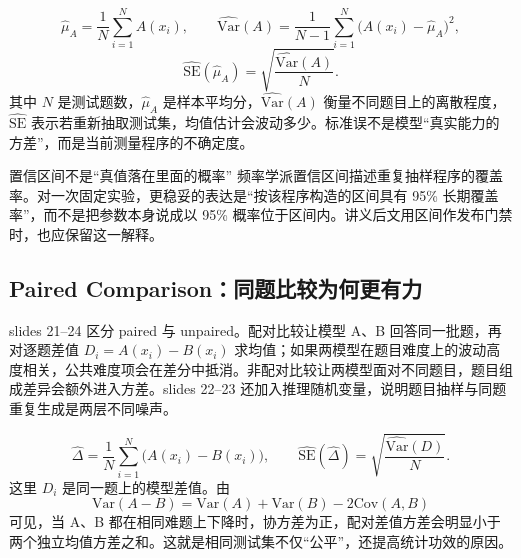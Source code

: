 
\[
\widehat\mu_A=\frac{1}{N}\sum_{i=1}^{N}A(x_i),\qquad
\widehat{\mathrm{Var}}(A)=\frac{1}{N-1}\sum_{i=1}^{N}\bigl(A(x_i)-\widehat\mu_A\bigr)^2,
\]
\[
\widehat{\mathrm{SE}}(\widehat\mu_A)
=\sqrt{\frac{\widehat{\mathrm{Var}}(A)}{N}}.
\]
其中 $N$ 是测试题数，$\widehat\mu_A$ 是样本平均分，$\widehat{\mathrm{Var}}(A)$ 衡量不同题目上的离散程度，$\widehat{\mathrm{SE}}$ 表示若重新抽取测试集，均值估计会波动多少。标准误不是模型“真实能力的方差”，而是当前测量程序的不确定度。

\begin{warningbox}{置信区间不是“真值落在里面的概率”}
频率学派置信区间描述重复抽样程序的覆盖率。对一次固定实验，更稳妥的表达是“按该程序构造的区间具有 95\% 长期覆盖率”，而不是把参数本身说成以 95\% 概率位于区间内。讲义后文用区间作发布门禁时，也应保留这一解释。
\end{warningbox}

\subsection{Paired Comparison：同题比较为何更有力}

slides 21--24 区分 paired 与 unpaired。配对比较让模型 A、B 回答同一批题，再对逐题差值 $D_i=A(x_i)-B(x_i)$ 求均值；如果两模型在题目难度上的波动高度相关，公共难度项会在差分中抵消。非配对比较让两模型面对不同题目，题目组成差异会额外进入方差。slides 22--23 还加入推理随机变量，说明题目抽样与同题重复生成是两层不同噪声。


\[
\widehat\Delta=\frac1N\sum_{i=1}^{N}\bigl(A(x_i)-B(x_i)\bigr),\qquad
\widehat{\mathrm{SE}}(\widehat\Delta)
=\sqrt{\frac{\widehat{\mathrm{Var}}(D)}{N}}.
\]
这里 $D_i$ 是同一题上的模型差值。由
\[
\mathrm{Var}(A-B)=\mathrm{Var}(A)+\mathrm{Var}(B)-2\mathrm{Cov}(A,B)
\]
可见，当 A、B 都在相同难题上下降时，协方差为正，配对差值方差会明显小于两个独立均值方差之和。这就是相同测试集不仅“公平”，还提高统计功效的原因。

